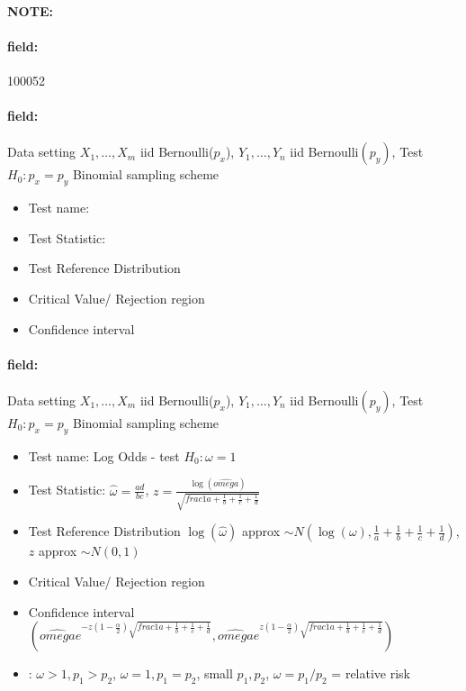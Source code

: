 \documentclass[12pt]{article}
\newenvironment{note}{\paragraph{NOTE:}}{}
\newenvironment{field}{\paragraph{field:}}{}
\begin{document}
\begin{note} \begin{field} \tiny 100052 \end{field}
 \begin{field}
  Data setting $X_1, \ldots , X_m$ iid Bernoulli($p_x$), $Y_1, \ldots, Y_n$ iid Bernoulli$(p_y)$, Test $H_0: p_x = p_y $ Binomial sampling scheme
  \begin{itemize}
   \item Test name:
   \item Test Statistic:
   \item Test Reference Distribution
   \item Critical Value/ Rejection region
   \item Confidence interval
  \end{itemize}
 \end{field}
 \begin{field}
  Data setting $X_1, \ldots , X_m$ iid Bernoulli($p_x$), $Y_1, \ldots, Y_n$ iid Bernoulli$(p_y)$, Test $H_0: p_x = p_y $ Binomial sampling scheme
  \begin{itemize}
   \item Test name: Log Odds - test $H_0: \omega = 1$
   \item Test Statistic: $\hat{\omega} = \frac{ad}{bc}$, $z = \frac{\log(\hat{omega})}{\sqrt{frac{1}{a} + \frac{1}{b} + \frac{1}{c} + \frac{1}{d}}}$
   \item Test Reference Distribution $ \log(\hat{\omega}) $ approx $\sim N(\log(\omega), \frac{1}{a} + \frac{1}{b} + \frac{1}{c} + \frac{1}{d})$, $z $ approx $\sim N(0,1)$
   \item Critical Value/ Rejection region
   \item Confidence interval $(\hat{omega}e^{-z(1 - \frac{\alpha}{2})\sqrt{frac{1}{a} + \frac{1}{b} + \frac{1}{c} + \frac{1}{d}}}, \hat{omega}e^{z(1 - \frac{\alpha}{2})\sqrt{frac{1}{a} + \frac{1}{b} + \frac{1}{c} + \frac{1}{d}}})$
   \item: $\omega > 1, p_1 > p_2$, $\omega = 1, p_1 = p_2$, small $p_1, p_2$, $\omega = p_1/p_2$ = relative risk
  \end{itemize}
 \end{field}
\end{note}
\end{document}
